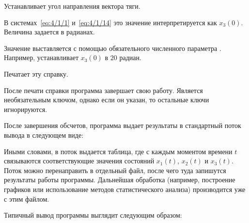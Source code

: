 	\item[\code{-x3~num}]
		Устанавливает угол направления вектора тяги.
		
		В системах~\ref{eq:4/1/1} и~\ref{eq:4/1/14} это значение интерпретируется как $x_3(0)$. Величина задается в радианах.
		
		Значение выставляется с помощью обязательного численного параметра . Например,  устанавливает $x_3(0)$ в $20$ радиан.
		
	\item[\code{--help}]
		Печатает эту справку.
		
		После печати справки программа завершает свою работу. Является необязательным ключом, однако если он указан, то остальные ключи игнорируются.
\edescr

После завершения обсчетов, программа выдает результаты в стандартный поток вывода в следующем виде:


Иными словами, в поток выдается таблица, где с каждым моментом времени $t$ связываются соответствующие значения состояний $x_1(t)$, $x_2(t)$ и $x_3(t)$. Поток можно перенаправить в отдельный файл, после чего туда запишутся результаты работы программы. Дальнейшая обработка (например, построение графиков или использование методов статистического анализа) производится уже с этим файлом.

Типичный вывод программы выглядит следующим образом:


